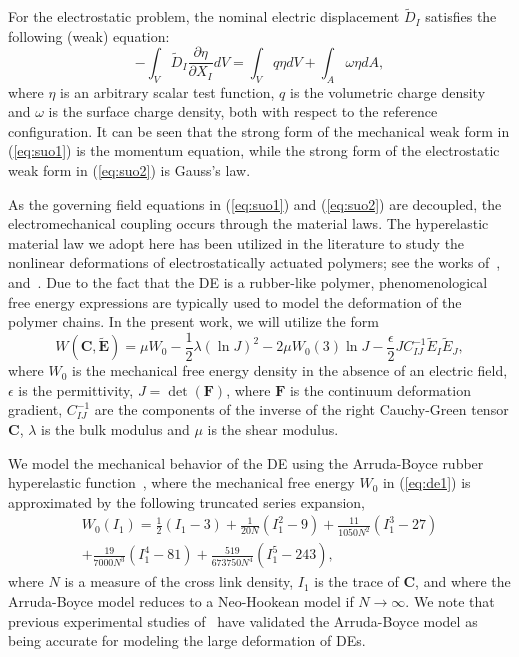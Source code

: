 \documentclass[8.5pt,twoside,twocolumn]{article}
\newcommand{\mbf}{\mathbf}
\begin{document}
For the electrostatic problem, the nominal electric displacement $\tilde{D}_{I}$ satisfies the following (weak) equation:
\begin{equation}\label{eq:suo2} -\int_{V}\tilde{D}_{I}\frac{\partial\eta}{\partial X_{I}}dV=\int_{V}q\eta dV+\int_{A}\omega\eta dA,
\end{equation}
where $\eta$ is an arbitrary scalar test function, $q$ is the volumetric charge density and $\omega$ is the surface charge density, both with respect to the reference configuration.  It can be seen that the strong form of the mechanical weak form in (\ref{eq:suo1}) is the momentum equation, while the strong form of the electrostatic weak form in (\ref{eq:suo2}) is Gauss's law.  

As the governing field equations in (\ref{eq:suo1}) and (\ref{eq:suo2}) are decoupled, the electromechanical coupling occurs through the material laws.  The hyperelastic material law we adopt here has been utilized in the literature to study the nonlinear deformations of electrostatically actuated polymers; see the works of~\citet{vuIJNME2007}, and~\citet{zhaoAPL2007}.  Due to the fact that the DE is a rubber-like polymer, phenomenological free energy expressions are typically used to model the deformation of the polymer chains.  In the present work, we will utilize the form~\citep{vuIJNME2007,zhaoAPL2007}
\begin{equation}\label{eq:de1} W(\mbf{C},\tilde{\mbf{E}})=\mu W_{0}-\frac{1}{2}\lambda(\ln{J})^{2}-2\mu W_{0}(3)\ln{J}-\frac{\epsilon}{2}JC_{IJ}^{-1}\tilde{E}_{I}\tilde{E}_{J},
\end{equation}
where $W_{0}$ is the mechanical free energy density in the absence of an electric field, $\epsilon$ is the permittivity, $J=\det(\mbf{F})$, where $\mbf{F}$ is the continuum deformation gradient, $C_{IJ}^{-1}$ are the components of the inverse of the right Cauchy-Green tensor $\mbf{C}$, $\lambda$ is the bulk modulus and $\mu$ is the shear modulus.  

We model the mechanical behavior of the DE using the Arruda-Boyce rubber hyperelastic function~\citep{arrudaJMPS1993}, where the mechanical free energy $W_{0}$ in (\ref{eq:de1}) is approximated by the following truncated series expansion,
\begin{eqnarray}\label{eq:de2} W_{0}(I_{1})=\frac{1}{2}(I_{1}-3)+\frac{1}{20N}(I_{1}^{2}-9)+\frac{11}{1050N^{2}}(I_{1}^{3}-27) \\ \nonumber
+\frac{19}{7000N^{3}}(I_{1}^{4}-81)+\frac{519}{673750N^{4}}(I_{1}^{5}-243),
\end{eqnarray}
where $N$ is a measure of the cross link density, $I_{1}$ is the trace of $\mbf{C}$, and where the Arruda-Boyce model reduces to a Neo-Hookean model if $N\rightarrow\infty$.  We note that previous experimental studies of~\citet{wisslerSAA2007a} have validated the Arruda-Boyce model as being accurate for modeling the large deformation of DEs.  
\end{document}
